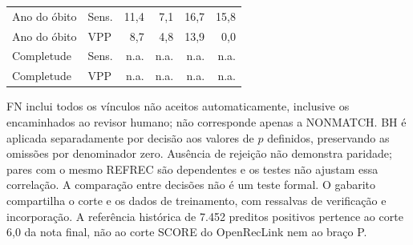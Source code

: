 \begin{table}[htbp]
{\begin{tabular}{llrrrr}
Ano do \'obito & Sens. & 11{,}4 & 7{,}1 & 16{,}7 & 15{,}8 \\
Ano do \'obito & VPP & 8{,}7 & 4{,}8 & 13{,}9 & 0{,}0 \\
Completude & Sens. & n.a. & n.a. & n.a. & n.a. \\
Completude & VPP & n.a. & n.a. & n.a. & n.a. \\
\bottomrule
\end{tabular}}
\par\smallskip
\begin{minipage}{\linewidth}\footnotesize FN inclui todos os vínculos não aceitos automaticamente, inclusive os encaminhados ao revisor humano; não corresponde apenas a NONMATCH. BH é aplicada separadamente por decisão aos valores de $p$ definidos, preservando as omissões por denominador zero. Ausência de rejeição não demonstra paridade; pares com o mesmo REFREC são dependentes e os testes não ajustam essa correlação. A comparação entre decisões não é um teste formal. O gabarito compartilha o corte e os dados de treinamento, com ressalvas de verificação e incorporação. A referência histórica de 7.452 preditos positivos pertence ao corte 6,0 da nota final, não ao corte SCORE do OpenRecLink nem ao braço P.\end{minipage}
\end{table}
